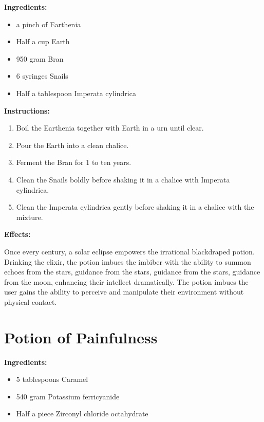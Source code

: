 \documentclass{article}
\begin{document}
\textbf{Ingredients:}

\begin{itemize}
  \item a pinch of Earthenia
  \item Half a cup Earth
  \item 950 gram Bran
  \item 6 syringes Snails
  \item Half a tablespoon Imperata cylindrica
\end{itemize}

\textbf{Instructions:}

\begin{enumerate}
  \item Boil the Earthenia together with Earth in a urn until clear.
  \item Pour the Earth into a clean chalice.
  \item Ferment the Bran for 1 to ten years.
  \item Clean the Snails boldly before shaking it in a chalice with Imperata cylindrica.
  \item Clean the Imperata cylindrica gently before shaking it in a chalice with the mixture.
\end{enumerate}

\textbf{Effects:}

Once every century, a solar eclipse empowers the irrational blackdraped potion. Drinking the elixir, the potion imbues the imbiber with the ability to summon echoes from the stars, guidance from the stars, guidance from the stars, guidance from the moon, enhancing their intellect dramatically. The potion imbues the user gains the ability to perceive and manipulate their environment without physical contact.

\newpage
\section*{Potion of Painfulness}

\textbf{Ingredients:}

\begin{itemize}
  \item 5 tablespoons Caramel
  \item 540 gram Potassium ferricyanide
  \item Half a piece Zirconyl chloride octahydrate
\end{itemize}
\end{document}
